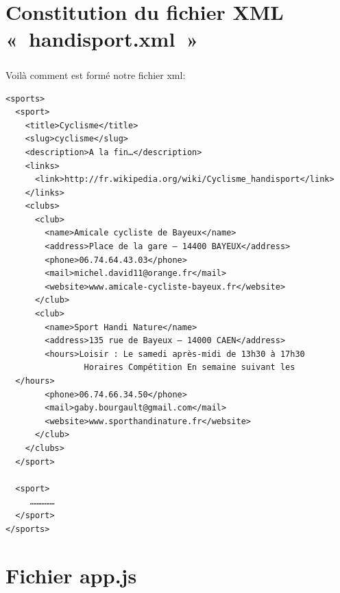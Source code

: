 \documentclass{report}
\begin{document}
\chapter{Constitution du fichier XML « handisport.xml »}
\thispagestyle{fancy}
	\paragraph{}{
		Voilà comment est formé notre fichier xml: \\

\begin{verbatim}
<sports>
  <sport>
	<title>Cyclisme</title>
	<slug>cyclisme</slug>
	<description>A la fin…</description>
	<links>
	  <link>http://fr.wikipedia.org/wiki/Cyclisme_handisport</link>
	</links>
	<clubs>
	  <club>
		<name>Amicale cycliste de Bayeux</name>
		<address>Place de la gare – 14400 BAYEUX</address>
		<phone>06.74.64.43.03</phone>
		<mail>michel.david11@orange.fr</mail>
		<website>www.amicale-cycliste-bayeux.fr</website>
	  </club>
	  <club>
		<name>Sport Handi Nature</name>
		<address>135 rue de Bayeux – 14000 CAEN</address>
		<hours>Loisir : Le samedi après-midi de 13h30 à 17h30
				Horaires Compétition En semaine suivant les
  </hours>
		<phone>06.74.66.34.50</phone>
		<mail>gaby.bourgault@gmail.com</mail>
		<website>www.sporthandinature.fr</website>
	  </club>
	</clubs>
  </sport>

  <sport>
	 ……………
  </sport>
</sports>
\end{verbatim}
	}




%
\chapter{Fichier app.js}
\thispagestyle{fancy}
\end{document}
